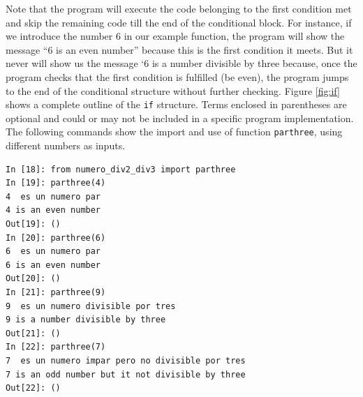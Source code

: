 \begin{paracol}{2}
Note that the program will execute the code belonging to the first condition met and skip the remaining code till the end of the conditional block. For instance, if we introduce the number $6$ in our example function, the program will show the message ``6 is an even number'' because this is the first condition it meets. But it never will show us the message `6 is a number divisible by three because, once the program checks that the first condition is fulfilled (be even), the program jumps to the end of the conditional structure without further checking.  Figure \ref{fig:if} shows a complete outline of the \texttt{if} structure. Terms enclosed in parentheses are optional and could or may not be included in a specific program implementation. The following commands show the import and use of function \texttt{parthree}, using different numbers as inputs.
\end{paracol}

\begin{center}
    \begin{minipage}{.5\textwidth}
\begin{verbatim}
In [18]: from numero_div2_div3 import parthree
In [19]: parthree(4)
4  es un numero par
4 is an even number
Out[19]: ()
In [20]: parthree(6)
6  es un numero par
6 is an even number
Out[20]: ()
In [21]: parthree(9)
9  es un numero divisible por tres
9 is a number divisible by three
Out[21]: ()
In [22]: parthree(7)
7  es un numero impar pero no divisible por tres
7 is an odd number but it not divisible by three
Out[22]: ()
\end{verbatim}
\end{minipage}
\end{center}


